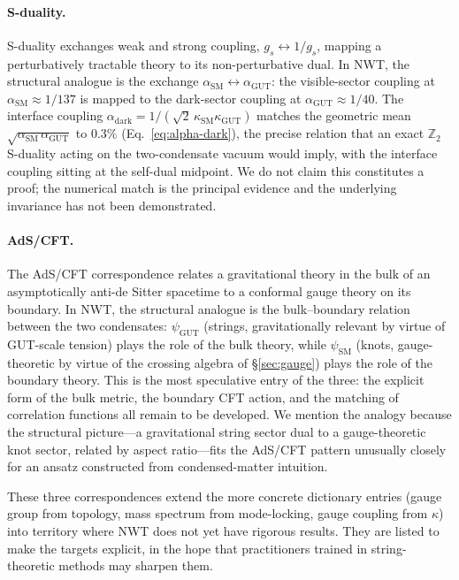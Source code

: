 \documentclass[11pt]{article}
\begin{document}
\paragraph{S-duality.}
S-duality exchanges weak and strong coupling, $g_s \leftrightarrow 1/g_s$, mapping a perturbatively tractable theory to its non-perturbative dual.
In NWT, the structural analogue is the exchange $\alpha_\text{SM} \leftrightarrow \alpha_\text{GUT}$: the visible-sector coupling at $\alpha_\text{SM} \approx 1/137$ is mapped to the dark-sector coupling at $\alpha_\text{GUT} \approx 1/40$.
The interface coupling $\alpha_\text{dark} = 1/(\sqrt{2}\,\kappa_\text{SM}\kappa_\text{GUT})$ matches the geometric mean $\sqrt{\alpha_\text{SM}\,\alpha_\text{GUT}}$ to $0.3\%$ (Eq.~\eqref{eq:alpha-dark}), the precise relation that an exact $\mathbb{Z}_2$ S-duality acting on the two-condensate vacuum would imply, with the interface coupling sitting at the self-dual midpoint.
We do not claim this constitutes a proof; the numerical match is the principal evidence and the underlying invariance has not been demonstrated.

\paragraph{AdS/CFT.}
The AdS/CFT correspondence relates a gravitational theory in the bulk of an asymptotically anti-de Sitter spacetime to a conformal gauge theory on its boundary.
In NWT, the structural analogue is the bulk--boundary relation between the two condensates: $\psi_\text{GUT}$ (strings, gravitationally relevant by virtue of GUT-scale tension) plays the role of the bulk theory, while $\psi_\text{SM}$ (knots, gauge-theoretic by virtue of the crossing algebra of \S\ref{sec:gauge}) plays the role of the boundary theory.
This is the most speculative entry of the three: the explicit form of the bulk metric, the boundary CFT action, and the matching of correlation functions all remain to be developed.
We mention the analogy because the structural picture---a gravitational string sector dual to a gauge-theoretic knot sector, related by aspect ratio---fits the AdS/CFT pattern unusually closely for an ansatz constructed from condensed-matter intuition.

These three correspondences extend the more concrete dictionary entries (gauge group from topology, mass spectrum from mode-locking, gauge coupling from $\kappa$) into territory where NWT does not yet have rigorous results.
They are listed to make the targets explicit, in the hope that practitioners trained in string-theoretic methods may sharpen them.
\end{document}
